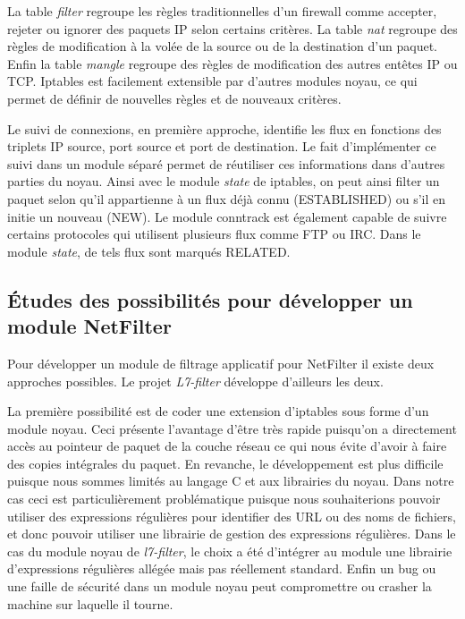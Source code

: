 La table \textit{filter} regroupe les règles traditionnelles d'un
firewall comme accepter, rejeter ou ignorer des paquets IP selon
certains critères. La table \textit{nat} regroupe des règles de
modification à la volée de la source ou de la destination d'un
paquet. Enfin la table \textit{mangle} regroupe des règles de
modification des autres entêtes IP ou TCP. Iptables est facilement
extensible par d'autres modules noyau, ce qui permet de définir de
nouvelles règles et de nouveaux critères.

Le suivi de connexions, en première approche, identifie les flux en
fonctions des triplets IP source, port source et port de
destination. Le fait d'implémenter ce suivi dans un module séparé
permet de réutiliser ces informations dans d'autres parties du
noyau. Ainsi avec le module \textit{state} de iptables, on peut ainsi
filter un paquet selon qu'il appartienne à un flux déjà connu
(ESTABLISHED) ou s'il en initie un nouveau (NEW). Le module conntrack est
également capable de suivre certains protocoles qui utilisent
plusieurs flux comme FTP ou IRC. Dans le module \textit{state}, de
tels flux sont marqués RELATED.

\subsection{Études des possibilités pour développer un module NetFilter}

Pour développer un module de filtrage applicatif pour NetFilter il
existe deux approches possibles. Le projet \textit{L7-filter}
\cite{l7} développe d'ailleurs les deux.

La première possibilité est de coder une extension d'iptables sous
forme d'un module noyau. Ceci présente l'avantage d'être très rapide
puisqu'on a directement accès au pointeur de paquet de la couche
réseau ce qui nous évite d'avoir à faire des copies intégrales du
paquet. En revanche, le développement est plus difficile puisque nous
sommes limités au langage C et aux librairies du noyau. Dans notre cas
ceci est particulièrement problématique puisque nous souhaiterions
pouvoir utiliser des expressions régulières pour identifier des URL ou
des noms de fichiers, et donc pouvoir utiliser une librairie de
gestion des expressions régulières. Dans le cas du module noyau de
\textit{l7-filter}, le choix a été d'intégrer au module une librairie
d'expressions régulières allégée mais pas réellement
standard. Enfin un bug ou une faille de sécurité dans un module noyau
peut compromettre ou crasher la machine sur laquelle il tourne.

